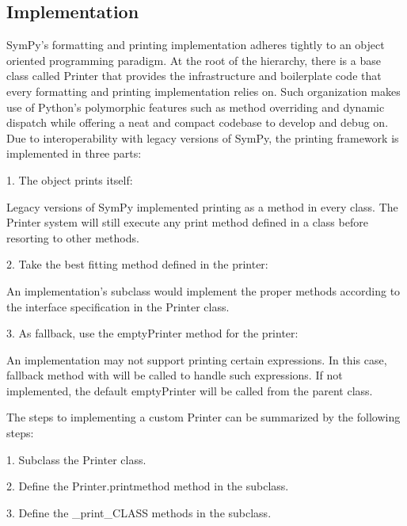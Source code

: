 \documentclass[11pt]{article}
\begin{document}
\subsection{Implementation}
SymPy’s formatting and printing implementation adheres tightly to an object oriented programming paradigm. At the root of the hierarchy, there is a base class called Printer that provides the infrastructure and boilerplate code that every formatting and printing implementation relies on. Such organization makes use of Python’s polymorphic features such as method overriding and dynamic dispatch while offering a neat and compact codebase to develop and debug on. Due to interoperability with legacy versions of SymPy, the printing framework is implemented in three parts:

1. The object prints itself:

Legacy versions of SymPy implemented printing as a method in every class. The Printer system will still execute any print method defined in a class before resorting to other methods.

2. Take the best fitting method defined in the printer:

An implementation’s subclass would implement the proper methods according to the interface specification in the Printer class.

3. As fallback, use the emptyPrinter method for the printer:

An implementation may not support printing certain expressions. In this case, fallback method with will be called to handle such expressions. If not implemented, the default emptyPrinter will be called from the parent class.

The steps to implementing a custom Printer can be summarized by the following steps:

1. Subclass the Printer class.

2. Define the Printer.printmethod method in the subclass.

3. Define the \_print\_CLASS methods in the subclass.
\end{document}
